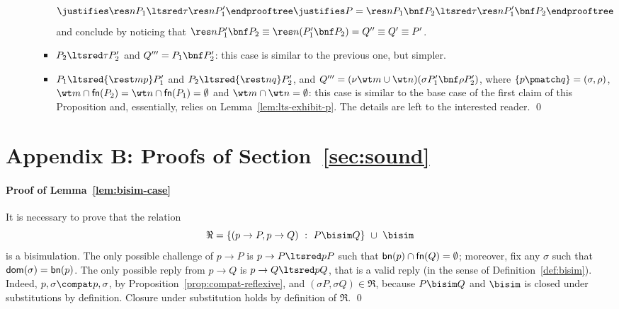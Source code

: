 \documentclass{LMCS}
\newcommand{\withsetnot}[2]{#2}
\begin{document}
\begin{itemize}
\begin{itemize}
\begin{itemize}
$$				\justifies \res n P_1 \ltsred\tau \res n P_1'
				\endprooftree 
			\justifies P = \res n P_1 \bnf P_2 \ltsred\tau \res n P_1'\bnf P_2
			\endprooftree 
			$$
			and conclude by noticing that $\res n P_1'\bnf P_2 \equiv \res n (P_1'\bnf P_2) = Q'' \equiv Q' \equiv P'$.
		\item $P_2 \ltsred\tau P_2'$ and $Q''' = P_1\bnf P_2'$: this case is similar to the previous one, but simpler.
		\item $P_1 \ltsred{\rest m p} P_1'$ and $P_2 \ltsred{\rest n q} P_2'$, and $Q''' = 
			(\nu \withsetnot{\wt m,\wt n}{\wt m\cup \wt n})(\sigma P_1'\bnf \rho P_2')$, where $\{p \pmatch q\} = (\sigma, \rho)$,
			$\wt m \cap {\sf fn}(P_2) = \wt n \cap {\sf fn}(P_1) = \emptyset$ and $\wt m \cap \wt n = \emptyset$:
			this case is similar to the base case of the first claim of this Proposition and, essentially, relies
			on Lemma~\ref{lem:lts-exhibit-p}. The details are left to the interested reader.
\qed
			\end{itemize}
		\end{itemize}
\end{itemize}


\section*{Appendix B: Proofs of Section~\ref{sec:sound}}

\paragraph{Proof of Lemma~\ref{lem:bisim-case}}
It is necessary to prove that the relation
$$
\Re = \{(p \to P , p \to Q)\ :\ P \bisim Q\}\ \cup\ \bisim
$$
is a bisimulation. The only possible challenge of $p \to P$ is
$p \to P \ltsred p P$ such that ${\sf bn}(p) \cap {\sf fn}(Q) = \emptyset$;
moreover, fix any $\sigma$ such that ${\sf dom}(\sigma) = {\sf bn}(p)$.
The only possible reply from $p \to Q$ is $p \to Q \ltsred p Q$, that is
a valid reply (in the sense of Definition~\ref {def:bisim}). Indeed,
$p,\sigma \compat p,\sigma$, by Proposition~\ref{prop:compat-reflexive},
and $(\sigma P , \sigma Q) \in \Re$, because $P \bisim Q$ and 
$\bisim$ is closed under substitutions by definition.
Closure under substitution holds by definition of $\Re$.
\qed
\end{document}
